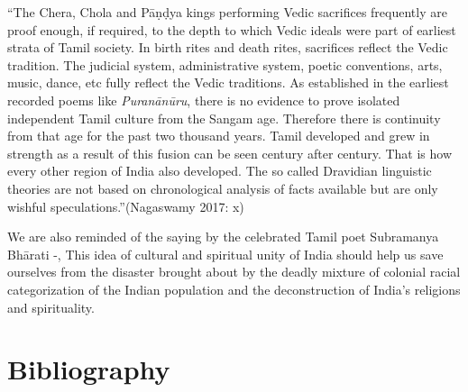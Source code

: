 \begin{myquote}
“The Chera, Chola and Pāṇḍya kings performing Vedic sacrifices frequently are proof enough, if required, to the depth to which Vedic ideals were part of earliest strata of Tamil society. In birth rites and death rites, sacrifices reflect the Vedic tradition. The judicial system, administrative system, poetic conventions, arts, music, dance, etc fully reflect the Vedic traditions. As established in the earliest recorded poems like \textit{Puranānūru}, there is no evidence to prove isolated independent Tamil culture from the Sangam age. Therefore there is continuity from that age for the past two thousand years. Tamil developed and grew in strength as a result of this fusion can be seen century after century. That is how every other region of India also developed. The so called Dravidian linguistic theories are not based on chronological analysis of facts available but are only wishful speculations.”\hfill (Nagaswamy 2017: x)
\end{myquote}

We are also reminded of the saying by the celebrated Tamil poet Subramanya Bhārati -, This idea of cultural and spiritual unity of India should help us save ourselves from the disaster brought about by the deadly mixture of colonial racial categorization of the Indian population and the deconstruction of India’s religions and spirituality.


\section*{Bibliography}

